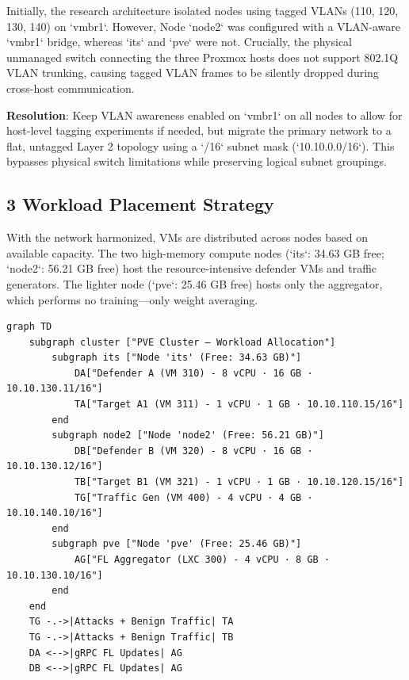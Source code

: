 \documentclass[conference]{IEEEtran}
\begin{document}
Initially, the research architecture isolated nodes using tagged VLANs (110, 120, 130, 140) on `vmbr1`. However, Node `node2` was configured with a VLAN-aware `vmbr1` bridge, whereas `its` and `pve` were not. Crucially, the physical unmanaged switch connecting the three Proxmox hosts does not support 802.1Q VLAN trunking, causing tagged VLAN frames to be silently dropped during cross-host communication.

\textbf{Resolution}: Keep VLAN awareness enabled on `vmbr1` on all nodes to allow for host-level tagging experiments if needed, but migrate the primary network to a flat, untagged Layer 2 topology using a `/16` subnet mask (`10.10.0.0/16`). This bypasses physical switch limitations while preserving logical subnet groupings.


\subsection{3 Workload Placement Strategy}

With the network harmonized, VMs are distributed across nodes based on available capacity. The two high-memory compute nodes (`its`: 34.63 GB free; `node2`: 56.21 GB free) host the resource-intensive defender VMs and traffic generators. The lighter node (`pve`: 25.46 GB free) hosts only the aggregator, which performs no training—only weight averaging.

\begin{verbatim}
graph TD
    subgraph cluster ["PVE Cluster – Workload Allocation"]
        subgraph its ["Node 'its' (Free: 34.63 GB)"]
            DA["Defender A (VM 310) - 8 vCPU · 16 GB · 10.10.130.11/16"]
            TA["Target A1 (VM 311) - 1 vCPU · 1 GB · 10.10.110.15/16"]
        end
        subgraph node2 ["Node 'node2' (Free: 56.21 GB)"]
            DB["Defender B (VM 320) - 8 vCPU · 16 GB · 10.10.130.12/16"]
            TB["Target B1 (VM 321) - 1 vCPU · 1 GB · 10.10.120.15/16"]
            TG["Traffic Gen (VM 400) - 4 vCPU · 4 GB · 10.10.140.10/16"]
        end
        subgraph pve ["Node 'pve' (Free: 25.46 GB)"]
            AG["FL Aggregator (LXC 300) - 4 vCPU · 8 GB · 10.10.130.10/16"]
        end
    end
    TG -.->|Attacks + Benign Traffic| TA
    TG -.->|Attacks + Benign Traffic| TB
    DA <-->|gRPC FL Updates| AG
    DB <-->|gRPC FL Updates| AG
\end{verbatim}
\end{document}
